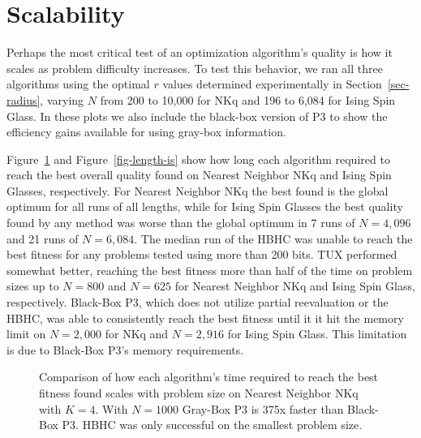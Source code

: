 \begin{figure*}
  \centering
  \caption{Comparison of Gray-Box P3's solution quality during optimization on a log-log scale for different $r$ values.
  For NKq-Landscapes $N=6,000$ and $K=4$ and for Ising Spin Glasses $N=6,084$.}
  \label{fig-radius-over}
\end{figure*}

\section{Scalability}
Perhaps the most critical test of an optimization algorithm's quality is
how it scales as problem difficulty increases. To test this behavior,
we ran all three algorithms using the optimal $r$ values determined experimentally in Section~\ref{sec-radius},
varying $N$ from 200 to 10,000 for NKq and 196 to 6,084 for Ising Spin Glass.
In these plots we also include the black-box version of P3 to show the efficiency
gains available for using gray-box information.


Figure~\ref{fig-length-nn} and Figure~\ref{fig-length-is} show how long each
algorithm required to reach the best overall quality found on Nearest Neighbor NKq
and Ising Spin Glasses, respectively. For Nearest Neighbor NKq the best found
is the global optimum for all runs of all lengths, while for Ising Spin Glasses
the best quality found by any method was worse than the global optimum in 7 runs of
$N=4,096$ and 21 runs of $N=6,084$. The median run of the HBHC was unable to reach the best fitness
for any problems tested using more than 200 bits. TUX performed somewhat better, reaching
the best fitness more than half of the time on problem sizes up to $N=800$ and $N=625$ for Nearest Neighbor NKq and Ising
Spin Glass, respectively. Black-Box P3, which does not utilize partial reevaluation or the HBHC,
was able to consistently reach the best fitness until it it hit the memory limit on $N=2,000$ for
NKq and $N=2,916$ for Ising Spin Glass. This limitation is due to Black-Box P3's
 memory requirements.


\begin{figure}
  \centering
  \caption{Comparison of how each algorithm's time required to reach the best fitness found scales with problem size
  on Nearest Neighbor NKq with $K=4$. With $N=1000$ Gray-Box P3 is 375x faster than Black-Box P3.
  HBHC was only successful on the smallest problem size.}
  \label{fig-length-nn}
\end{figure}


